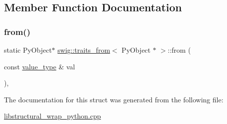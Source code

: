 \subsection{Member Function Documentation}
\mbox{\label{structswig_1_1traits__from_3_01_py_object_01_5_01_4_ab383a520e9f35b0d778819da07efd42d}} 
\subsubsection{\texorpdfstring{from()}{from()}}
{\footnotesize\ttfamily static Py\+Object$\ast$ \hyperlink{structswig_1_1traits__from}{swig\+::traits\+\_\+from}$<$ Py\+Object $\ast$ $>$\+::from (\begin{DoxyParamCaption}\item[{const \hyperlink{structswig_1_1traits__from_3_01_py_object_01_5_01_4_a3f736b20ca687eb0894c64d1b8ec2b11}{value\+\_\+type} \&}]{val }\end{DoxyParamCaption})\hspace{0.3cm}{\ttfamily [inline]}, {\ttfamily [static]}}



The documentation for this struct was generated from the following file\+:\begin{DoxyCompactItemize}
\item 
\hyperlink{libstructural__wrap__python_8cpp}{libstructural\+\_\+wrap\+\_\+python.\+cpp}\end{DoxyCompactItemize}
